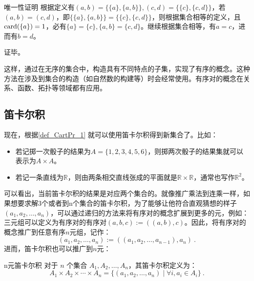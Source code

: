 \begin{example}{唯一性证明}
根据定义有$(a, b) = \{\{a\}, \{a, b\}\} , (c, d) = \{\{c\}, \{c, d\}\} $，若$(a, b)=(c,d)$，即$\{\{a\}, \{a, b\}\}=\{\{c\}, \{c, d\}\}$，则根据集合相等的定义，且${\rm card}(\{a\})=1$，必有$\{a\}=\{c\},\{a, b\}=\{c, d\}$。继续根据集合相等，有$a=c$，进而有$b=d$。

证毕。
\end{example}

这样，通过在无序的集合中，构造具有不同特点的子集，实现了有序的概念。这种方法在涉及到集合的构造（如自然数的构建等）时会经常使用。有序对的概念在关系、函数、拓扑等领域都有应用。

\subsection{笛卡尔积}

现在，根据\autoref{def_CartPr_1} 就可以使用笛卡尔积得到新集合了。比如：
\begin{itemize}
\item 若记掷一次骰子的结果为$A=\{1, 2, 3, 4, 5, 6\}$，则掷两次骰子的结果集就可以表示为$A\times A$。
\item 若记一条直线为${\mathbb R}$，则由两条相交直线张成的平面就是${\mathbb R}\times{\mathbb R}$，通常也写作${\mathbb R}^2$。
\end{itemize}
可以看出，当前笛卡尔积的结果是对应两个集合的。就像推广乘法到连乘一样，如果想要求解3个或者到n个集合的笛卡尔积，为了能够让他符合直观猜想的样子$(a_1, a_2, \ldots, a_n)$，可以通过递归的方法来将有序对的概念扩展到更多的元，例如：三元组可以定义为有序对的有序对$(a, b, c) := ((a, b), c)$。因此，将有序对的概念推广到任意有序$n$元组，记作：
\begin{equation}
(a_1, a_2, \ldots, a_n) := ((a_1, a_2, \ldots, a_{n-1}), a_n)~.
\end{equation}
进而，笛卡尔积也可以推广到$n$元：
\begin{definition}{n元笛卡尔积}
对于 $n$ 个集合 $A_1, A_2, \ldots, A_n$，其笛卡尔积定义为：
\begin{equation}
A_1 \times A_2 \times \cdots \times A_n = \{(a_1, a_2, \ldots, a_n) \mid \forall i,a_i \in A_i \} ~.
\end{equation}
\end{definition}